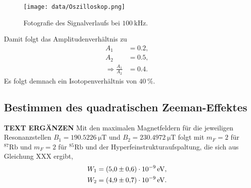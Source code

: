 \begin{figure}[H]
    \centering
    \texttt{[image: data/Oszilloskop.png]}
    \caption{Fotografie des Signalverlaufs bei $\SI{100}{\kilo\hertz}$.}
    \label{fig:Oszilloskop}
\end{figure}

Damit folgt das Amplitudenverhältnis zu
\begin{align*}
    A_1 &= 0.2, \\
    A_2 &= 0.5, \\
    \Rightarrow \frac{A_1}{A_2} &= 0.4.
\end{align*}
Es folgt demnach ein Isotopenverhältnis von $\SI{40}{\percent}$.

\subsection{Bestimmen des quadratischen Zeeman-Effektes}
\label{subsec:quadrZeeman}

\textbf{TEXT ERGÄNZEN}
Mit den maximalen Magnetfeldern für die jeweiligen Resonanzstellen $B_1 = \SI{190.5226}{\micro\tesla}$ und $B_2 = \SI{230.4972}{\micro\tesla}$ folgt mit $m_F=2$ für $^{87}\text{Rb}$
und $m_F = 2$ für $^{85}\text{Rb}$ und der Hyperfeinstrukturaufspaltung, die sich aus Gleichung XXX ergibt,
\begin{align*}
    W_1 &= \SI{5.0+-0.6 e-09}{\eV}, \\
    W_2 &= \SI{4.9+-0.7 e-09}{\eV}.
\end{align*}
